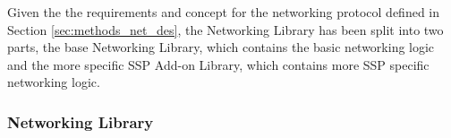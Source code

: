 
Given the the requirements and concept for the networking protocol defined in Section \ref{sec:methods_net_des}, the Networking Library has been split into two parts, the base Networking Library, which contains the basic networking logic and the more specific SSP Add-on Library, which contains more SSP specific networking logic.

\subsubsection{\label{sec:methods_networking}Networking Library}


